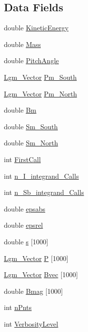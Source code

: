 \subsection*{Data Fields}
\begin{CompactItemize}
\item 
double \hyperlink{struct_lgm___field_int_info_869c8a1c2af0f48c6e871b08c13d2852}{KineticEnergy}
\item 
double \hyperlink{struct_lgm___field_int_info_c33418187547ea28dda7063924f34df6}{Mass}
\item 
double \hyperlink{struct_lgm___field_int_info_86da8321817d74036d3ff23e8643dc68}{PitchAngle}
\item 
\hyperlink{struct_lgm___vector}{Lgm\_\-Vector} \hyperlink{struct_lgm___field_int_info_a6b4371f4272ea673b10df3806973a78}{Pm\_\-South}
\item 
\hyperlink{struct_lgm___vector}{Lgm\_\-Vector} \hyperlink{struct_lgm___field_int_info_680815020ea7ef4edf84c04a0d7f1f20}{Pm\_\-North}
\item 
double \hyperlink{struct_lgm___field_int_info_8e90af044e680fe06a5f4745ead8b8d7}{Bm}
\item 
double \hyperlink{struct_lgm___field_int_info_91d445e45d4679505b1a9b5b7cde690c}{Sm\_\-South}
\item 
double \hyperlink{struct_lgm___field_int_info_e133118dcb4b4b581ae49086e9d16be3}{Sm\_\-North}
\item 
int \hyperlink{struct_lgm___field_int_info_52587930b11ea1eb053f0306dbc7973e}{FirstCall}
\item 
int \hyperlink{struct_lgm___field_int_info_5c3c9425f92b88e4cb8d1ee9129761d8}{n\_\-I\_\-integrand\_\-Calls}
\item 
int \hyperlink{struct_lgm___field_int_info_1f89d256729806dd1da1e84501e8d036}{n\_\-Sb\_\-integrand\_\-Calls}
\item 
double \hyperlink{struct_lgm___field_int_info_6aa234e3efbe6cefea9099de9f303f49}{epsabs}
\item 
double \hyperlink{struct_lgm___field_int_info_15d3900b8e4e4f00f7ae7d806828dd17}{epsrel}
\item 
double \hyperlink{struct_lgm___field_int_info_ceb7ba559344361c1beb271fc337896e}{s} \mbox{[}1000\mbox{]}
\item 
\hyperlink{struct_lgm___vector}{Lgm\_\-Vector} \hyperlink{struct_lgm___field_int_info_5ba0c6b33b6c0cb721daa1a92f0fdba2}{P} \mbox{[}1000\mbox{]}
\item 
\hyperlink{struct_lgm___vector}{Lgm\_\-Vector} \hyperlink{struct_lgm___field_int_info_861cd8f26a851c335b39a0f42a644bd8}{Bvec} \mbox{[}1000\mbox{]}
\item 
double \hyperlink{struct_lgm___field_int_info_6abcff3fdb33e77737583c51c10132e2}{Bmag} \mbox{[}1000\mbox{]}
\item 
int \hyperlink{struct_lgm___field_int_info_e64e724dd0713b2ba2fca5aedab3fd34}{nPnts}
\item 
int \hyperlink{struct_lgm___field_int_info_ef3011234df74566b679b46e01273bb7}{VerbosityLevel}
\end{CompactItemize}


